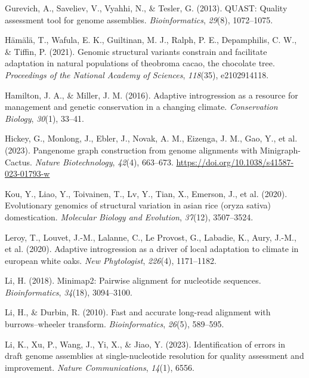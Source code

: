 \documentclass[
]{agujournal2019}
\newlength{\cslhangindent}
\newenvironment{CSLReferences}[2] %
 {\begin{list}{}{%
  \setlength{\itemindent}{0pt}
  \setlength{\leftmargin}{0pt}
  \setlength{\parsep}{0pt}
  \ifodd #1
   \setlength{\leftmargin}{\cslhangindent}
   \setlength{\itemindent}{-1\cslhangindent}
  \fi
  \setlength{\itemsep}{#2\baselineskip}}}
 {\end{list}}
\begin{document}
\begin{CSLReferences}{1}{0}
Gurevich, A., Saveliev, V., Vyahhi, N., \& Tesler, G. (2013). QUAST:
Quality assessment tool for genome assemblies. \emph{Bioinformatics},
\emph{29}(8), 1072--1075.

Hämälä, T., Wafula, E. K., Guiltinan, M. J., Ralph, P. E., Depamphilis,
C. W., \& Tiffin, P. (2021). Genomic structural variants constrain and
facilitate adaptation in natural populations of theobroma cacao, the
chocolate tree. \emph{Proceedings of the National Academy of Sciences},
\emph{118}(35), e2102914118.

Hamilton, J. A., \& Miller, J. M. (2016). Adaptive introgression as a
resource for management and genetic conservation in a changing climate.
\emph{Conservation Biology}, \emph{30}(1), 33--41.

Hickey, G., Monlong, J., Ebler, J., Novak, A. M., Eizenga, J. M., Gao,
Y., et al. (2023). Pangenome graph construction from genome alignments
with Minigraph-Cactus. \emph{Nature Biotechnology}, \emph{42}(4),
663--673. \url{https://doi.org/10.1038/s41587-023-01793-w}

Kou, Y., Liao, Y., Toivainen, T., Lv, Y., Tian, X., Emerson, J., et al.
(2020). Evolutionary genomics of structural variation in asian rice
(oryza sativa) domestication. \emph{Molecular Biology and Evolution},
\emph{37}(12), 3507--3524.

Leroy, T., Louvet, J.-M., Lalanne, C., Le Provost, G., Labadie, K.,
Aury, J.-M., et al. (2020). Adaptive introgression as a driver of local
adaptation to climate in european white oaks. \emph{New Phytologist},
\emph{226}(4), 1171--1182.

Li, H. (2018). Minimap2: Pairwise alignment for nucleotide sequences.
\emph{Bioinformatics}, \emph{34}(18), 3094--3100.

Li, H., \& Durbin, R. (2010). Fast and accurate long-read alignment with
burrows--wheeler transform. \emph{Bioinformatics}, \emph{26}(5),
589--595.

Li, K., Xu, P., Wang, J., Yi, X., \& Jiao, Y. (2023). Identification of
errors in draft genome assemblies at single-nucleotide resolution for
quality assessment and improvement. \emph{Nature Communications},
\emph{14}(1), 6556.


\end{CSLReferences}
\end{document}
